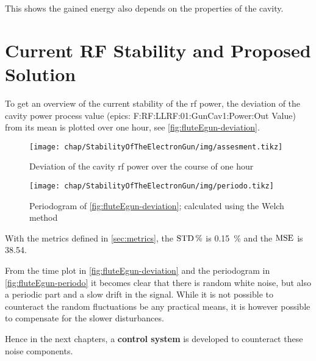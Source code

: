 This shows the gained energy also depends on the properties of the cavity.

\section{Current RF Stability and Proposed Solution}
To get an overview of the current stability of the \gls{rf} power, the deviation of the cavity power process value (\gls{epics}: F:RF:LLRF:01:GunCav1:Power:Out Value) from its mean is plotted over one hour, see \autoref{fig:fluteEgun-deviation}.

\begin{figure}[tb]
	\centering
	\texttt{[image: chap/StabilityOfTheElectronGun/img/assesment.tikz]}
	\caption{Deviation of the cavity \gls{rf} power over the course of one hour}
	\label{fig:fluteEgun-deviation}
\end{figure}

\begin{figure}[tb]
	\centering
	\texttt{[image: chap/StabilityOfTheElectronGun/img/periodo.tikz]}
	\caption{Periodogram of \autoref{fig:fluteEgun-deviation}; calculated using the Welch method}
	\label{fig:fluteEgun-periodo}
\end{figure}

With the metrics defined in \autoref{sec:metrics}, the $\operatorname{STD}\%$ is \SI{0.15}{\percent} and the $\operatorname{MSE}$ is \num{38.54}.

From the time plot in \autoref{fig:fluteEgun-deviation} and the periodogram in \autoref{fig:fluteEgun-periodo} it becomes clear that there is random white noise, but also a periodic part and a slow drift in the signal. While it is not possible to counteract the random fluctuations be any practical means, it is however possible to compensate for the slower disturbances.

Hence in the next chapters, a \textbf{control system} is developed to counteract these noise components.







